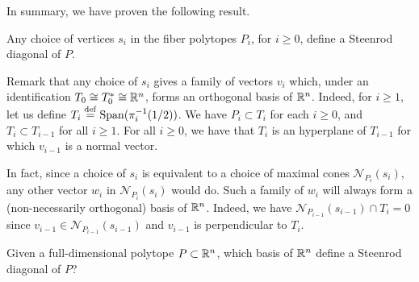 In summary, we have proven the following result.

\begin{theorem}
    Any choice of vertices $s_i$ in the fiber polytopes $P_i$, for $i\geq 0$, define a Steenrod diagonal of $P$.
\end{theorem}

Remark that any choice of $s_i$ gives a family of vectors $v_i$ which, under an identification $T_0 \cong T_0^{*} \cong \mathbb{R}^n$, forms an orthogonal basis of $\mathbb{R}^n$. Indeed, for $i \geq 1$, let us define $T_i \stackrel{\mathrm{def}}{=} \operatorname{\mathrm{Span}}(\pi_{i}^{-1}(1/2))$. We have $P_i \subset T_i$ for each $i \geq 0$, and $T_i \subset T_{i-1}$ for all $i\geq 1$. For all $i \geq 0$, we have that $T_i$ is an hyperplane of $T_{i-1}$ for which $v_{i-1}$ is a normal vector.

In fact, since a choice of $s_i$ is equivalent to a choice of maximal cones $\mathcal{N}_{P_i}(s_i)$, any other vector $w_i$ in $\mathcal{N}_{P_i}(s_i)$ would do. Such a family of $w_i$ will always form a (non-necessarily orthogonal) basis of $\mathbb{R}^n$. Indeed, we have $\mathcal{N}_{P_{i-1}}(s_{i-1}) \cap T_{i} = 0$ since $v_{i-1} \in \mathcal{N}_{P_{i-1}}(s_{i-1})$ and $v_{i-1}$ is perpendicular to $T_i$.

\begin{question}
    Given a full-dimensional polytope $P \subset \mathbb{R}^n$, which basis of $\mathbb{R}^n$ define a Steenrod diagonal of $P$?
\end{question}

\begin{example}
\end{example}

\begin{example}[Zonotopes]
\end{example}





